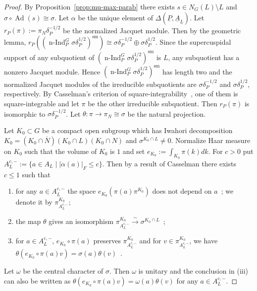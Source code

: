 \documentclass[a4paper]{amsart}
\numberwithin{equation}{section}
\theoremstyle{remark}
\theoremstyle{definition}
\DeclareMathOperator{\nInd}{n-Ind}
\DeclareMathOperator{\Ad}{Ad}
\newcommand{\sm}{\mathrm{sm}}
\newcommand{\alggrp}[1]{\underline{#1}}
\renewcommand{\simeq}{\cong}
\begin{document}
\begin{proof}
By Proposition~\ref{prop:mu-max-parab} there exists $s\in N_{G}(L)\setminus L$ and $\sigma\circ\Ad(s)\simeq \sigma$.
Let $\alpha$ be the unique element of $\Delta(\alggrp{P},\alggrp{A}_{\alggrp{L}})$.
Let $r_{P}(\pi) := \pi_{N}\delta_{P}^{-1/2}$ be the normalized Jacquet module.
Then by the geometric lemma, $r_{P}((\nInd_{P}^{G}\sigma\delta_{P}^{1/2})^{\sm})\simeq \sigma\delta_{P}^{-1/2}\oplus \sigma\delta_{P}^{1/2}$.
Since the supercuspidal support of any subquotient of $(\nInd_{P}^{G}\sigma\delta_{P}^{1/2})^{\sm}$ is $L$, any subquotient has a nonzero Jacquet module.
Hence $(\nInd_{P}^{G}\sigma\delta_{P}^{1/2})^{\sm}$ has length two and the normalized Jacquet modules of the irreducible subquotients are $\sigma\delta_{P}^{-1/2}$ and $\sigma\delta_{P}^{1/2}$, respectively.
By Casselman's criterion of square-integrability~\cite[Theorem~4.4.6]{Casselman-note}, one of them is square-integrable and let $\pi$ be the other irreducible subquotient.
Then $r_{P}(\pi)$ is isomorphic to $\sigma\delta_{P}^{-1/2}$.
Let $\theta\colon \pi\to \pi_{N}\simeq \sigma$ be the natural projection.

Let $K_{0}\subset G$ be a compact open subgroup which has Iwahori decomposition $K_{0} = (K_{0}\cap \overline{N})(K_{0}\cap L)(K_{0}\cap N)$ and $\sigma^{K_{0}\cap L} \ne 0$. Normalize Haar measure on $K_{0}$ such that the volume of $K_{0}$ is $1$ and set $e_{K_{0}} := \int_{K_{0}}\pi(k)dk$.
For $c > 0$ put $A_{L}^{c,-} := \{a\in A_{L}\mid \lvert \alpha(a)\rvert_F \le c\}$.
Then by a result of Casselman there exists $c\le 1$ such that 
\begin{enumerate}
\item for any $a\in A_{L}^{c,-}$ the space $e_{K_{0}}(\pi(a)\pi^{K_{0}})$ does not depend on $a$~\cite[Proposition~4.1.6]{Casselman-note}; we denote it by $\pi^{K_{0}}_{A_{L}^{c,-}}$;
\item the map $\theta$ gives an isomorphism $\pi^{K_{0}}_{A_{L}^{c,-}}\xrightarrow{\sim}\sigma^{K_{0}\cap L}$~\cite[Proposition~4.1.4]{Casselman-note};
\item for $a\in A_{L}^{c,-}$, $e_{K_{0}}\circ\pi(a)$ preserves $\pi_{A_{L}^{c,-}}^{K_{0}}$ and for $v\in \pi_{A_{L}^{c,-}}^{K_{0}}$, we have $\theta(e_{K_0}\circ \pi(a)v) = \sigma(a)\theta(v)$~\cite[Lemma~4.1.1]{Casselman-note}.
\end{enumerate}
Let $\omega$ be the central character of $\sigma$.
Then $\omega$ is unitary and the conclusion in (iii) can also be written as $\theta(e_{K_{0}}\circ \pi(a)v) = \omega(a)\theta(v)$ for any $a\in A_{L}^{c,-}$.


\end{proof}
\end{document}
